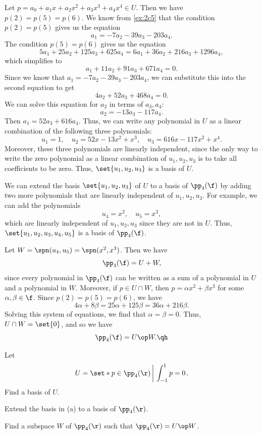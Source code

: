 \begin{sole}
    \item Let $p = a_0 + a_1 x + a_2 x^2 + a_3 x^3 + a_4 x^4 \in U$. Then we have $p(2) = p(5) = p(6)$. We know from \autoref{ex:2c5} that the condition $p(2) = p(5)$ gives us the equation
    \[a_1 = -7a_2 - 39a_3 - 203a_4.\]
    The condition $p(5) = p(6)$ gives us the equation
    \[5a_1 + 25a_2 + 125a_3 + 625a_4 = 6a_1 + 36a_2 + 216a_3 + 1296a_4,\]
    which simplifies to
    \[a_1 + 11a_2 + 91a_3 + 671a_4 = 0.\]
    Since we know that $a_1 = -7a_2 - 39a_3 - 203a_4$, we can substitute this into the second equation to get
    \[4a_2 + 52a_3 + 468a_4 = 0.\]
    We can solve this equation for $a_2$ in terms of $a_3, a_4$:
    \[a_2 = -13a_3 - 117a_4.\]
    Then $a_1 = 52a_3 + 616a_4$. Thus, we can write any polynomial in $U$ as a linear combination of the following three polynomials:
    \[u_1 = 1, \quad u_2 = 52x - 13x^2 + x^3, \quad u_3 = 616x - 117x^2 + x^4.\]
    Moreover, these three polynomials are linearly independent, since the only way to write the zero polynomial as a linear combination of $u_1, u_2, u_3$ is to take all coefficients to be zero. Thus, $\set{u_1, u_2, u_3}$ is a basis of $U$.
    \item We can extend the basis $\set{u_1, u_2, u_3}$ of $U$ to a basis of $\pp_4(\f)$ by adding two more polynomials that are linearly independent of $u_1, u_2, u_3$. For example, we can add the polynomials
    \[u_4 = x^2, \quad u_5 = x^3,\]
    which are linearly independent of $u_1, u_2, u_3$ since they are not in $U$. Thus, $\set{u_1, u_2, u_3, u_4, u_5}$ is a basis of $\pp_4(\f)$.
    \item Let $W = \spn(u_4, u_5) = \spn(x^2, x^3)$. Then we have
    \[\pp_4(\f) = U + W,\]
    since every polynomial in $\pp_4(\f)$ can be written as a sum of a polynomial in $U$ and a polynomial in $W$. Moreover, if $p \in U \cap W$, then $p = \alpha x^2 + \beta x^3$ for some $\alpha, \beta \in \f$. Since $p(2) = p(5) = p(6)$, we have
    \[4\alpha + 8\beta = 25\alpha + 125\beta = 36\alpha + 216\beta.\]
    Solving this system of equations, we find that $\alpha = \beta = 0$. Thus, $U \cap W = \set{0}$, and so we have
    \[\pp_4(\f) = U \op W. \qh\]
\end{sole}

\begin{exercise}[2c7]
    \begin{subexercises}
        \item Let
        \[U = \set*{p \in \pp_4(\r) \left|~\int_{-1}^{1} p = 0 \right.}.\]
        Find a basis of $U$.
        \item Extend the basis in (a) to a basis of $\pp_4(\r)$.
        \item Find a subspace $W$ of $\pp_4(\r)$ such that $\pp_4(\r) = U \op W$.
    \end{subexercises}
\end{exercise}

